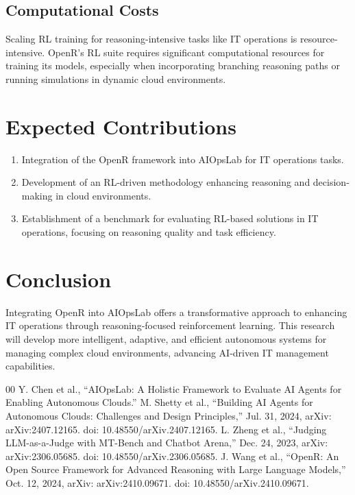 \documentclass[conference]{IEEEtran}
\begin{document}
\subsection{Computational Costs}
Scaling RL training for reasoning-intensive tasks like IT operations is resource-intensive. OpenR's RL suite requires significant computational resources for training its models, especially when incorporating branching reasoning paths or running simulations in dynamic cloud environments.

\section{Expected Contributions}
\begin{enumerate}
    \item Integration of the OpenR framework into AIOpsLab for IT operations tasks.
    \item Development of an RL-driven methodology enhancing reasoning and decision-making in cloud environments.
    \item Establishment of a benchmark for evaluating RL-based solutions in IT operations, focusing on reasoning quality and task efficiency.
\end{enumerate}

\section{Conclusion}
Integrating OpenR into AIOpsLab offers a transformative approach to enhancing IT operations through reasoning-focused reinforcement learning. This research will develop more intelligent, adaptive, and efficient autonomous systems for managing complex cloud environments, advancing AI-driven IT management capabilities.

\begin{thebibliography}{00}
     Y. Chen et al., “AIOpsLab: A Holistic Framework to Evaluate AI Agents for Enabling Autonomous Clouds.”
     M. Shetty et al., “Building AI Agents for Autonomous Clouds: Challenges and Design Principles,” Jul. 31, 2024, arXiv: arXiv:2407.12165. doi: 10.48550/arXiv.2407.12165.
     L. Zheng et al., “Judging LLM-as-a-Judge with MT-Bench and Chatbot Arena,” Dec. 24, 2023, arXiv: arXiv:2306.05685. doi: 10.48550/arXiv.2306.05685.
     J. Wang et al., “OpenR: An Open Source Framework for Advanced Reasoning with Large Language Models,” Oct. 12, 2024, arXiv: arXiv:2410.09671. doi: 10.48550/arXiv.2410.09671.
\end{thebibliography}
\end{document}
